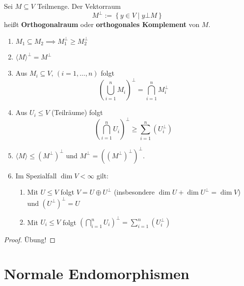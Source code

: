 \documentclass[parskip,a4paper,twoside,DIV15,BCOR12mm]{scrbook}
\begin{document}
\begin{definition}
Sei \(M\subseteq V\) Teilmenge. Der Vektorraum
\[
M^{\bot}:=\left\{y\in V\mid y\bot M\right\}
\]
heißt \textbf{Orthogonalraum} oder \textbf{orthogonales Komplement} von 
\(M\).
\end{definition}
\begin{lemma}
\begin{enumerate}
\item \(M_{1}\subseteq M_{2}\implies M_{1}^{\bot}\geq M_{2}^{\bot}\)
\item \(\langle M\rangle^{\bot}=M^{\bot}\)
\item Aus \(M_{i}\subseteq V,\,(i=1,\ldots,n)\) folgt 
\[
\left(\bigcup_{i=1}^{n}M_{i}\right)^{\bot}=\bigcap_{i=1}^{n}M_{i}^{\bot}
\]
\item Aus \(U_{i}\leq V\) (Teilräume) folgt
\[
\left(\bigcap_{i=1}^{n}U_{i}\right)^{\bot}\geq\sum_{i=1}^{n}{\left(U_{i}^{\bot}\right)}
\]
\item \(\langle M\rangle\leq\left(M^{\bot}\right)^{\bot}\) und
\(M^{\bot}=\left(\left(M^{\bot}\right)^{\bot}\right)^{\bot}\).
\item Im Spezialfall \(\dim V<\infty\) gilt:
\begin{enumerate}
\item Mit \(U\leq V\) folgt \(V=U\oplus U^{\bot}\) (insbesondere \(\dim U+\dim U^{\bot}=\dim V\)) und \(\left(U^{\bot}\right)^{\bot}=U\)
\item Mit \(U_{i}\leq V\) folgt 
\(\left(\bigcap_{i=1}^{n}U_{i}\right)^{\bot}=\sum_{i=1}^{n}{\left(U_{i}^{\bot}\right)}\)
\end{enumerate}
\end{enumerate}
\end{lemma}
\begin{proof}
\"Ubung!
\end{proof}

\chapter{Normale Endomorphismen}
\end{document}
